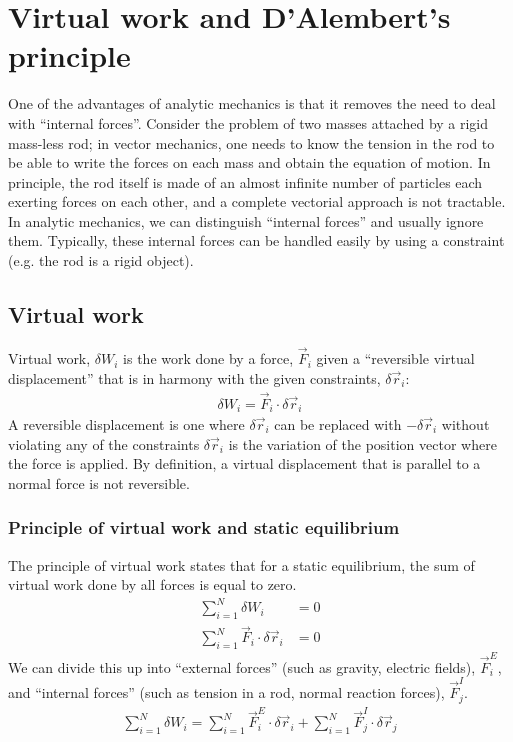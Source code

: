 %
\chapter{Virtual work and D'Alembert's principle}
One of the advantages of analytic mechanics is that it removes the need to deal with ``internal forces''. Consider the problem of two masses attached by a rigid mass-less rod; in vector mechanics, one needs to know the tension in the rod to be able to write the forces on each mass and obtain the equation of motion. In principle, the rod itself is made of an almost infinite number of particles each exerting forces on each other, and a complete vectorial approach is not tractable. In analytic mechanics, we can distinguish ``internal forces'' and usually ignore them. Typically, these internal forces can be handled easily by using a constraint (e.g. the rod is a rigid object).

\section{Virtual work}
Virtual work, $\delta W_i$ is the work done by a force, $\vec{F}_i$ given a ``reversible virtual displacement'' that is in harmony with the given constraints, $\delta\vec{r}_i$:
\begin{align}
\delta W_i = \vec{F}_i\cdot\delta\vec{r}_i
\end{align}
A reversible displacement is one where $\delta\vec{r}_i$ can be replaced with $-\delta\vec{r}_i$ without violating any of the constraints $\delta\vec{r}_i$ is the variation of the position vector where the force is applied.  By definition, a virtual displacement that is parallel to a normal force is not reversible.

\subsection{Principle of virtual work and static equilibrium}
The principle of virtual work states that for a static equilibrium, the sum of virtual work done by all forces is equal to zero.
\begin{align}
\sum_{i=1}^N\delta W_i &= 0 \nonumber\\
\sum_{i=1}^N\vec{F}_i\cdot\delta\vec{r}_i &= 0
\end{align}
We can divide this up into ``external forces'' (such as gravity, electric fields), $\vec{F}^E_i$, and ``internal forces'' (such as tension in a rod, normal reaction forces), $\vec{F}^I_j$.
\begin{align}
\sum_{i=1}^N\delta W_i=\sum_{i=1}^N \vec{F}^E_i\cdot\delta\vec{r}_i + \sum_{i=1}^N\vec{F}^I_j\cdot\delta\vec{r}_j
\end{align}

